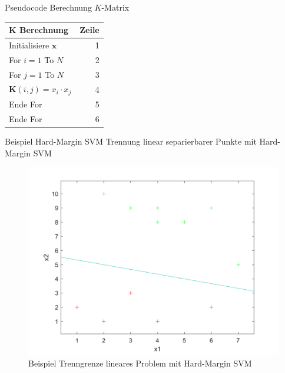 \documentclass[ngerman]{beamer}
\begin{document}
\begin{frame}{Pseudocode Berechnung $K$-Matrix}
    \centering
    \begin{tabular}{l r}
        $\mathbf{K}$ \textbf{Berechnung} & \textbf{Zeile} \\
        \hline
        Initialisiere $\mathbf{x}$ & 1 \\ \pause
        For $i=1$ To $N$ & 2 \\
        \quad For $j=1$ To $N$ & 3 \\ \pause
        \quad\quad $\mathbf{K}\left( i, j \right) = x_{i} \cdot x_{j}$ & 4 \\
        \quad Ende For & 5 \\
        Ende For & 6 \\
    \end{tabular}
\end{frame}

\begin{frame}{Beispiel Hard-Margin SVM}
    Trennung linear separierbarer Punkte mit Hard-Margin SVM \\ \pause
    \begin{center}
        \begin{figure}
            \includegraphics[width=\textwidth,height=0.7\textheight,keepaspectratio]{../code/octave/images/svmsimple}
            \caption{Beispiel Trenngrenze lineares Problem mit Hard-Margin SVM}
            \label{fig:bsphmsvm}
        \end{figure}
    \end{center}
\end{frame}
\end{document}
